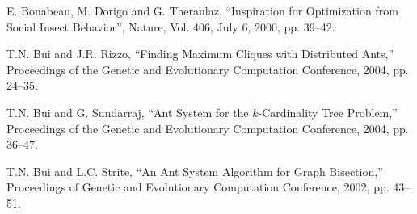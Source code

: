 \documentclass[11pt]{article}
\begin{document}
\begin{thebibliography}{99} 





E. Bonabeau, M. Dorigo and G. Theraulaz,
``Inspiration for Optimization from Social Insect Behavior'',
Nature, Vol. 406, July 6, 2000, pp. 39--42.





T.N. Bui and J.R. Rizzo, ``Finding Maximum Cliques with Distributed Ants,'' Proceedings of the Genetic and Evolutionary Computation Conference, 2004, pp. 24--35.

T.N. Bui  and G. Sundarraj,  ``Ant System for the $k$-Cardinality Tree Problem,'' Proceedings of the Genetic and Evolutionary Computation Conference, 2004, pp. 36--47.

T.N. Bui and L.C. Strite, ``An Ant System Algorithm for Graph Bisection,'' Proceedings of  Genetic and Evolutionary Computation Conference, 2002, pp. 43--51.







\end{thebibliography}
\end{document}
